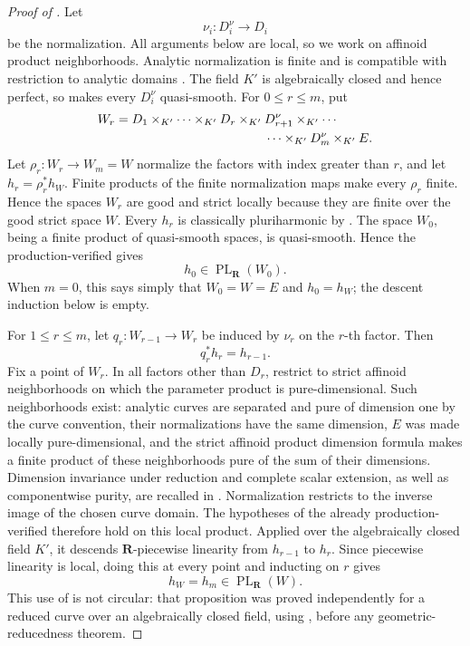 \begin{proof}[Proof of
]
Let
\[
                         \nu_i:D_i^\nu\longrightarrow D_i
\]
be the normalization.  All arguments below are local, so we work on
affinoid product neighborhoods.  Analytic normalization is finite and is
compatible with restriction to analytic domains
\cite[\S11.3.1]{CLD25}.  The field \(K'\) is algebraically closed and hence
perfect, so \cite[Lemma~3.9(1)]{GR25Classical} makes every \(D_i^\nu\)
quasi-smooth.  For \(0\leq r\leq m\), put
\[
\begin{aligned}
 W_r={}&D_1\times_{K'}\cdots\times_{K'}D_r
       \times_{K'}D_{r+1}^\nu\times_{K'}\cdots\\
      &\hspace{37mm}\cdots\times_{K'}D_m^\nu\times_{K'}E.
\end{aligned}
\]
Let \(\rho_r:W_r\to W_m=W\) normalize the factors with index greater
than \(r\), and let \(h_r=\rho_r^*h_W\).  Finite products of the finite
normalization maps make every \(\rho_r\) finite.  Hence the spaces \(W_r\)
are good and strict locally because they are finite over the good strict
space \(W\).  Every \(h_r\) is classically pluriharmonic by
\cite[Proposition~7.2(7)]{GR25Classical}.  The space \(W_0\), being a
finite product of quasi-smooth spaces, is quasi-smooth.  Hence the
production-verified
 gives
\[
                         h_0\in\operatorname{PL}_{\mathbf R}(W_0).
\]
When \(m=0\), this says simply that \(W_0=W=E\) and \(h_0=h_W\); the
descent induction below is empty.

For \(1\leq r\leq m\), let \(q_r:W_{r-1}\to W_r\) be induced by
\(\nu_r\) on the \(r\)-th factor.  Then
\[
                              q_r^*h_r=h_{r-1}.
\]
Fix a point of \(W_r\).  In all factors other than \(D_r\), restrict to
strict affinoid neighborhoods on which the parameter product is
pure-dimensional.  Such neighborhoods exist: analytic curves are separated
and pure of dimension one by the curve convention, their normalizations
have the same dimension, \(E\) was made locally pure-dimensional, and the
strict affinoid product dimension formula makes a finite product of these
neighborhoods pure of the sum of their dimensions.  Dimension invariance
under reduction and complete scalar extension, as well as componentwise
purity, are recalled in \cite[\S11.2.3--\S11.2.5]{CLD25}.  Normalization
restricts to the inverse image of the chosen curve domain.  The hypotheses
of the already production-verified
 therefore hold on this
local product.  Applied over the algebraically closed field \(K'\), it
descends \(\mathbf R\)-piecewise linearity from \(h_{r-1}\) to \(h_r\).
Since piecewise linearity is local, doing this at every point and inducting
on \(r\) gives
\[
                         h_W=h_m\in
                         \operatorname{PL}_{\mathbf R}(W).
\]
This use of
 is not circular: that
proposition was proved independently for a reduced curve over an
algebraically closed field, using
, before any geometric-reducedness
theorem.


\end{proof}
